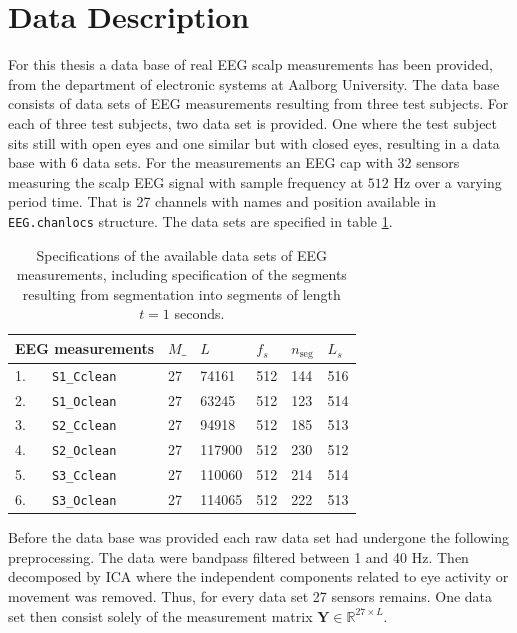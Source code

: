 \section{Data Description}
For this thesis a data base of real EEG scalp measurements has been provided, from the department of electronic systems at Aalborg University. 
The data base consists of data sets of EEG measurements resulting from three test subjects. 
For each of three test subjects, two data set is provided. One where the test subject sits still with open eyes and one similar but with closed eyes, resulting in a data base with 6 data sets. 
For the measurements an EEG cap with $32$ sensors measuring the scalp EEG signal with sample frequency at $512$ Hz over a varying period time.
That is 27 channels with names and position available in \texttt{EEG.chanlocs} structure.
The data sets are specified in table \ref{tab:data_spec}.
\begin{table}[H]
\centering
\begin{tabular}{|l|l|l|l|l|l|l|}
\hline
 \multicolumn{2}{|l|}{EEG measurements } & $M\_$ & $L$    & $f_s$ & $n_{\text{seg}}$ & $L_s$ \\ \hline
1.& \texttt{S1\_Cclean} & 27  & 74161  & 512   & 144       & 516   \\ \hline
2.& \texttt{S1\_Oclean} & 27  & 63245  & 512   & 123       & 514   \\ \hline
3.& \texttt{S2\_Cclean} & 27  & 94918  & 512   & 185       & 513   \\ \hline
4.& \texttt{S2\_Oclean} & 27  & 117900 & 512   & 230       & 512   \\ \hline
5.& \texttt{S3\_Cclean} & 27  & 110060 & 512   & 214       & 514   \\ \hline
6.& \texttt{S3\_Oclean} & 27  & 114065 & 512   & 222        & 513    \\ \hline
\end{tabular}
\caption{Specifications of the available data sets of EEG measurements, including specification of the segments resulting from segmentation into segments of length $t=1$ seconds.}
\label{tab:data_spec}
\end{table}
\noindent
Before the data base was provided each raw data set had undergone the following preprocessing.
The data were bandpass filtered between 1 and 40 Hz. Then decomposed by ICA where the independent components related to eye activity or movement was removed. 
Thus, for every data set 27 sensors remains. 
One data set then consist solely of the measurement matrix $\mathbf{Y} \in \mathbb{R}^{27\times L}$.

